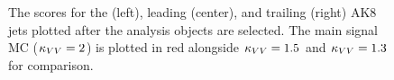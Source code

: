 \begin{figure}[htb]
    \centering
    \caption[The \ParticleNet score distribution for each of the three VBS \VVH AK8 jets plotted in data and MC before QCD resampling]{
        The \ParticleNet scores for the \Htobb (left), leading \Vtoqq (center), and trailing \Vtoqq (right) AK8 jets plotted after the analysis objects are selected. 
        The main signal MC ($\kappa_{VV} = 2$) is plotted in red alongside $\kappa_{VV} = 1.5$ and $\kappa_{VV} = 1.3$ for comparison. 
    }
    \label{fig:vbsvvh_dataMC_fatjet_scores_noCorr}
\end{figure}

